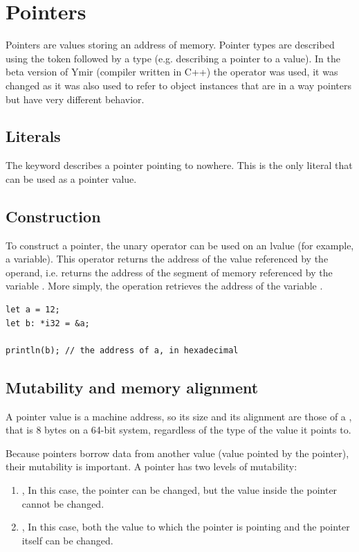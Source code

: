 \section{Pointers}%
\label{sec:compound:pointer_type}

Pointers are values storing an address of memory. Pointer types are described
using the \token{*} token followed by a type (e.g.  describing a
pointer to a  value). In the beta version of Ymir (compiler written
in C++) the operator \token{\&} was used, it was changed as it was also used to
refer to object instances that are in a way pointers but have very different
behavior.

\subsection{Literals}

The keyword  describes a pointer pointing to nowhere.
This is the only literal that can be used as a pointer value.

\subsection{Construction}

To construct a pointer, the unary operator \token{\&} can be used on an lvalue
(for example, a variable). This operator returns the address of the value
referenced by the operand, i.e.  returns the address of the segment
of memory referenced by the variable . More simply, the operation
retrieves the address of the variable .

\begin{lstlisting}[style=coloredverbatim]
let a = 12;
let b: *i32 = &a;

println(b); // the address of a, in hexadecimal
\end{lstlisting}

\subsection{Mutability and memory alignment}

A pointer value is a machine address, so its size and its alignment are those of
a , that is 8 bytes on a 64-bit system, regardless of the type of
the value it points to.
\smallskip

Because pointers borrow data from another value (value pointed by the pointer),
their mutability is important. A pointer has two levels of mutability:
\begin{enumerate}
  \setlength\itemsep{-4pt}
\item {}, In this case, the pointer can be changed, but the value
  inside the pointer cannot be changed.
\item {}, In this case, both the value to which the pointer
  is pointing and the pointer itself can be changed.
\end{enumerate}

